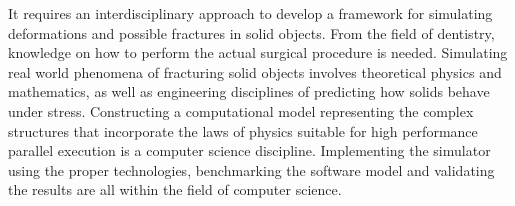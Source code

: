 It requires an interdisciplinary approach to develop a framework for
simulating deformations and possible fractures in solid objects. 
From the field of dentistry, knowledge on how to perform the actual surgical
procedure is needed. 
%
Simulating real world phenomena of
fracturing solid objects involves theoretical physics and mathematics, as well as
engineering disciplines of predicting how solids behave under
stress. 
%
Constructing a computational model representing the complex structures
that incorporate the laws of physics suitable for high performance
parallel execution is a computer science discipline. Implementing the
simulator using the proper technologies, benchmarking the
software model and validating the results are all within the
field of computer science. 


